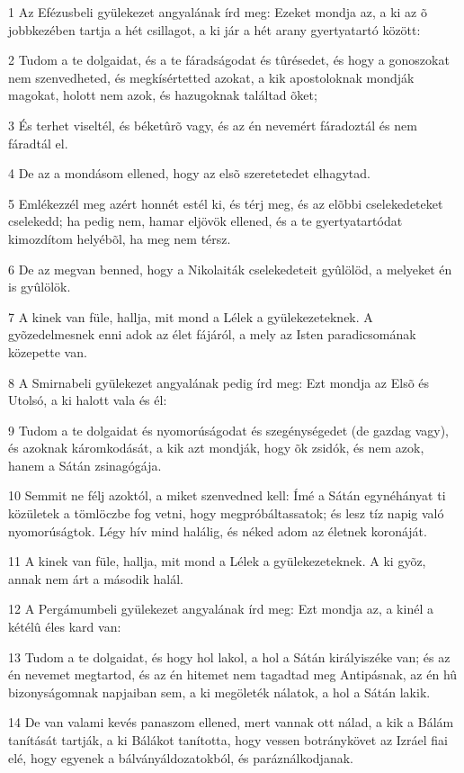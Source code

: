 \par 1 Az Efézusbeli gyülekezet angyalának írd meg: Ezeket mondja az, a ki az õ jobbkezében tartja a hét csillagot, a ki jár a hét arany gyertyatartó között:
\par 2 Tudom a te dolgaidat, és a te fáradságodat és tûrésedet, és hogy a gonoszokat nem szenvedheted, és megkísértetted azokat, a kik apostoloknak mondják magokat, holott nem azok, és hazugoknak találtad õket;
\par 3 És terhet viseltél, és béketûrõ vagy, és az én nevemért fáradoztál és nem fáradtál el.
\par 4 De az a mondásom ellened, hogy az elsõ szeretetedet elhagytad.
\par 5 Emlékezzél meg azért honnét estél ki, és térj meg, és az elõbbi cselekedeteket cselekedd; ha pedig nem, hamar eljövök ellened, és a te gyertyatartódat kimozdítom helyébõl, ha meg nem térsz.
\par 6 De az megvan benned, hogy a Nikolaiták cselekedeteit gyûlölöd, a melyeket én is gyûlölök.
\par 7 A kinek van füle, hallja, mit mond a Lélek a gyülekezeteknek. A gyõzedelmesnek enni adok az élet fájáról, a mely az Isten paradicsomának közepette van.
\par 8 A Smirnabeli gyülekezet angyalának pedig írd meg: Ezt mondja az Elsõ és Utolsó, a ki halott vala és él:
\par 9 Tudom a te dolgaidat és nyomorúságodat és szegénységedet (de gazdag vagy), és azoknak káromkodását, a kik azt mondják, hogy õk zsidók, és nem azok, hanem a Sátán zsinagógája.
\par 10 Semmit ne félj azoktól, a miket szenvedned kell: Ímé a Sátán egynéhányat ti közületek a tömlöczbe fog vetni, hogy megpróbáltassatok; és lesz tíz napig való nyomorúságtok. Légy hív mind halálig, és néked adom az életnek koronáját.
\par 11 A kinek van füle, hallja, mit mond a Lélek a gyülekezeteknek. A ki gyõz, annak nem árt a második halál.
\par 12 A Pergámumbeli gyülekezet angyalának írd meg: Ezt mondja az, a kinél a kétélû éles kard van:
\par 13 Tudom a te dolgaidat, és hogy hol lakol, a hol a Sátán királyiszéke van; és az én nevemet megtartod, és az én hitemet nem tagadtad meg Antipásnak, az én hû bizonyságomnak napjaiban sem, a ki megöleték nálatok, a hol a Sátán lakik.
\par 14 De van valami kevés panaszom ellened, mert vannak ott nálad, a kik a Bálám tanítását tartják, a ki Bálákot tanította, hogy vessen botránykövet az Izráel fiai elé, hogy egyenek a bálványáldozatokból, és paráználkodjanak.
